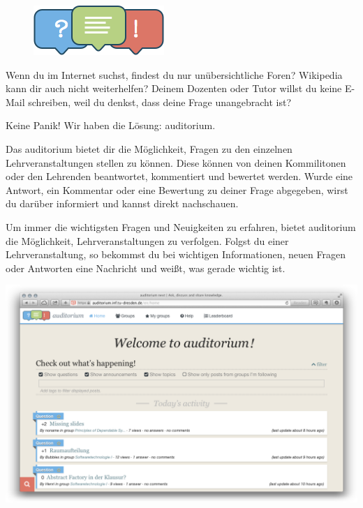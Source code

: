 \newpage


\begin{figure}
\includegraphics[width=.95\linewidth]{img/auditorium_logo}
\end{figure}

Wenn du im Internet suchst, findest du nur unübersichtliche Foren?
Wikipedia kann dir auch nicht weiterhelfen?
Deinem Dozenten oder Tutor willst du keine E-Mail schreiben, weil du denkst, dass deine Frage unangebracht ist?

Keine Panik!
Wir haben die Lösung: auditorium.

Das auditorium  bietet dir die Möglichkeit, Fragen zu den einzelnen Lehrveranstaltungen stellen zu können.
Diese können von deinen Kommilitonen oder den Lehrenden beantwortet, kommentiert und bewertet werden.
Wurde eine Antwort, ein Kommentar oder eine Bewertung zu deiner Frage abgegeben, wirst du darüber informiert und kannst direkt nachschauen.

Um immer die wichtigsten Fragen und Neuigkeiten zu erfahren, bietet auditorium die Möglichkeit, Lehrveranstaltungen zu verfolgen.
Folgst du einer Lehrveranstaltung, so bekommst du bei wichtigen Informationen, neuen Fragen oder Antworten eine Nachricht und weißt, was gerade wichtig ist.

{
\centering
\includegraphics[width=.75\linewidth]{img/auditorium.png}
\par
}

